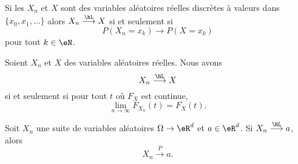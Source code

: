 \begin{proposition}
    Si les \( X_n\) et \( X\) sont des variables aléatoires réelles discrètes à valeurs dans \( \{ x_0,x_1,\ldots \}\) alors \( X_n\stackrel{\hL}{\longrightarrow} X\) si et seulement si
    \begin{equation}
        P(X_n=x_k)\to P(X=x_k)
    \end{equation}
    pour tout \( k\in\eN\).
\end{proposition}

\begin{proposition}     \label{PropXncvXFXcvFxt}
    Soient \( X_n\) et \( X\) des variables aléatoires réelles. Nous avons
    \begin{equation}
        X_n\stackrel{\hL}{\longrightarrow}X
    \end{equation}
    si et seulement si pour tout \( t\) où \( F_X\) est continue,
    \begin{equation}
        \lim_{n\to \infty} F_{X_n}(t)=F_X(t).
    \end{equation}
\end{proposition}

\begin{proposition}     \label{PropCvLfcvPsicst}
    Soit \( X_n\) une suite de variables aléatoires \( \Omega\to \eR^d\) et \( a\in\eR^d\). Si \( X_n\stackrel{\hL}{\longrightarrow}a\), alors
    \begin{equation}
        X_n\stackrel{P}{\longrightarrow}a.
    \end{equation}
\end{proposition}

